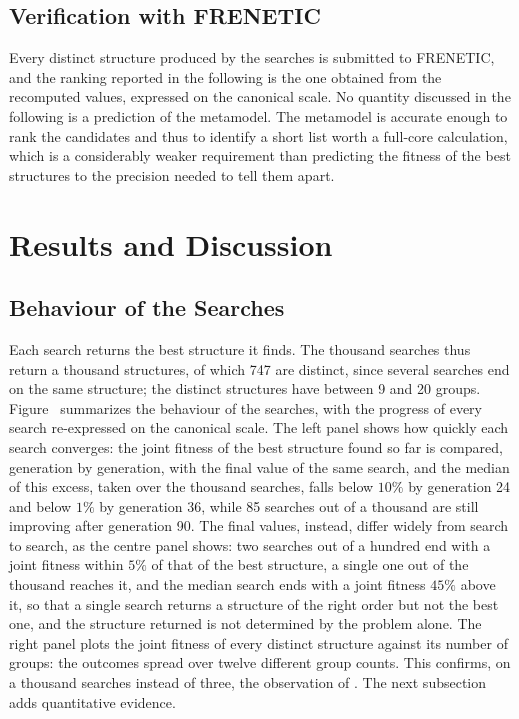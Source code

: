 \subsection{Verification with FRENETIC}

Every distinct structure produced by the searches is submitted to FRENETIC, and
the ranking reported in the following is the one obtained from the recomputed
values, expressed on the canonical scale. No quantity discussed in the following is a prediction of the metamodel.
The metamodel is accurate
enough to rank the candidates and thus to identify a short list worth a
full-core calculation, which is a considerably weaker requirement than
predicting the fitness of the best structures to the precision needed to tell
them apart.


\section{Results and Discussion}

\subsection{Behaviour of the Searches}

Each search returns the best structure it finds. The thousand searches thus
return a thousand structures, of which 747 are distinct, since several searches
end on the same structure; the distinct structures have between 9 and 20
groups. Figure~
summarizes the behaviour of the searches, with the progress of every search
re-expressed on the canonical scale. The left panel shows how quickly each
search converges: the joint fitness of the best structure found so far is
compared, generation by generation, with the final value of the same search,
and the median of this excess, taken over the thousand searches, falls below $10\%$ by
generation 24 and below $1\%$ by generation 36, while 85 searches out of a
thousand are still improving after generation 90. The final values, instead,
differ widely from search to search, as the centre panel shows: two searches out of a hundred end with a
joint fitness within $5\%$ of that of the best structure, a single one out of
the thousand reaches it, and the median search ends with a joint fitness
$45\%$ above it, so that a single search returns a structure of the right
order but not the best one, and the structure returned is not determined by
the problem alone. The right panel plots the joint fitness of every distinct
structure against its number of groups: the outcomes spread over twelve
different group counts. This confirms, on a thousand searches instead of
three, the observation of \citet{prevMulti}. The next subsection adds
quantitative evidence.

